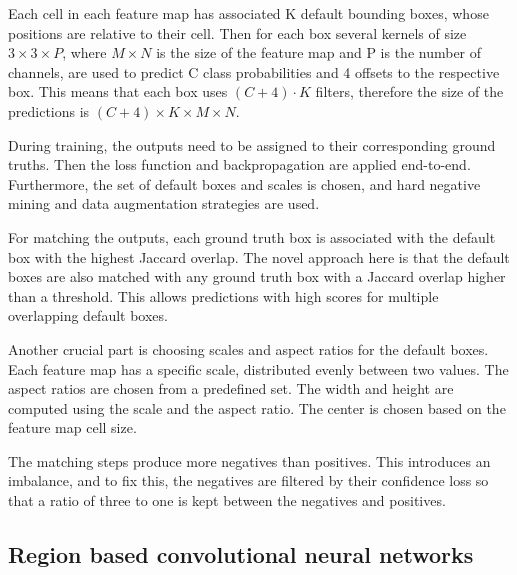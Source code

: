 Each cell in each feature map has associated K default bounding boxes, whose positions are relative to their cell. Then for each box several kernels of size $3 \times 3 \times P$, where $M \times N$ is the size of the feature map and P is the number of channels, are used to predict C class probabilities and 4 offsets to the respective box. This means that each box uses $(C+4)\cdot K$ filters, therefore the size of the predictions is $(C+4)  \times  K \times M \times N$.
        
During training, the outputs need to be assigned to their corresponding ground truths. Then the loss function and backpropagation are applied end-to-end. Furthermore, the set of default boxes and scales is chosen, and hard negative mining and data augmentation strategies are used.
        
For matching the outputs, each ground truth box is associated with the default box with the highest Jaccard overlap. The novel approach here is that the default boxes are also matched with any ground truth box with a Jaccard overlap higher than a threshold. This allows predictions with high scores for multiple overlapping default boxes.
        
        
Another crucial part is choosing scales and aspect ratios for the default boxes. Each feature map has a specific scale, distributed evenly between two values. The aspect ratios are chosen from a predefined set. The width and height are computed using the scale and the aspect ratio. The center is chosen based on the feature map cell size.
        
The matching steps produce more negatives than positives. This introduces an imbalance, and to fix this, the negatives are filtered by their confidence loss so that a ratio of three to one is kept between the negatives and positives.
        

\subsection{Region based convolutional neural networks}

